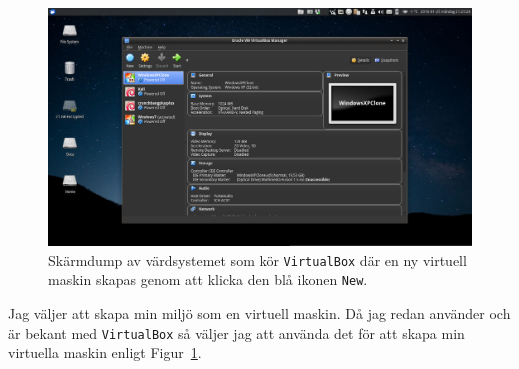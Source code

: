 \begin{figure}[htbp]
  \centering
    \includegraphics[width=\linewidth]{img/A_new-01}
    \caption{Skärmdump av värdsystemet som kör \texttt{VirtualBox} där en ny
             virtuell maskin skapas genom att klicka den blå ikonen \texttt{New}.}
  \label{fig:A_new-01}
\end{figure}

Jag väljer att skapa min miljö som en virtuell maskin. Då jag redan använder
och är bekant med \texttt{VirtualBox} så väljer jag att använda det för att
skapa min virtuella maskin enligt Figur~\ref{fig:A_new-01}.



